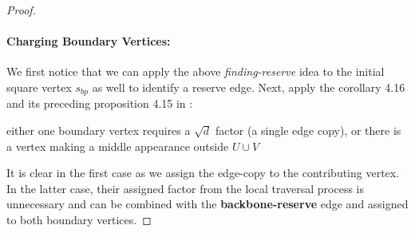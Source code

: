 \documentclass[12pt]{article}
\begin{document}
\begin{proof}
%
%
%
%
% 
% 
%
 
\paragraph{Charging Boundary Vertices:}
We first notice that we can apply the above \emph{finding-reserve} idea to the initial square vertex $s_{bp}$ as well to identify a reserve edge. Next, apply the corollary 4.16 and its preceding proposition 4.15 in \cite{HKPX23}:
\begin{displayquote} either one boundary vertex requires a $\sqrt{d}$ factor (a single edge copy), or there is a vertex making a middle appearance outside $U\cup V$
\end{displayquote}
It is clear in the first case as we assign the edge-copy to the contributing vertex. In the latter case, their assigned factor from the local traversal process is unnecessary and can be combined with the \textbf{backbone-reserve} edge and assigned to both boundary vertices.
\end{proof}
\end{document}
